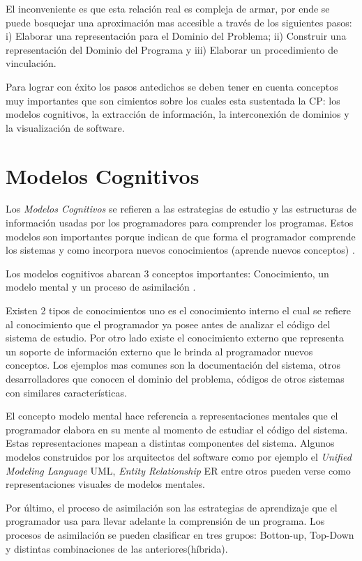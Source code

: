 \documentclass[12pt]{report}
\begin{document}
El inconveniente es que esta relación real es compleja de armar, por ende se puede bosquejar una aproximación mas accesible a través de los siguientes pasos: i) Elaborar una representación para el Dominio del Problema; ii)
Construir una representación del Dominio del Programa y iii) Elaborar un procedimiento de vinculación.
 
Para lograr con éxito los pasos antedichos se deben tener en cuenta conceptos muy importantes que son cimientos sobre los cuales esta sustentada la CP: los modelos cognitivos, la extracción de información, la interconexión de dominios y la visualización de software.

\section{Modelos Cognitivos}

Los \textit{Modelos Cognitivos} se refieren a las estrategias de estudio y las estructuras de información usadas por los programadores para comprender los programas. Estos modelos son importantes porque indican de que forma el programador comprende los sistemas y como incorpora nuevos conocimientos (aprende nuevos conceptos) \cite{MBPHRU10}.

Los modelos cognitivos abarcan 3 conceptos importantes: Conocimiento, un modelo mental y un proceso de asimilación \cite{MAS05}.

Existen 2 tipos de conocimientos uno es el conocimiento interno el cual se refiere al conocimiento que el programador ya posee antes de analizar el código del sistema de estudio. Por otro lado existe el conocimiento externo que representa un soporte de información externo que le brinda al programador nuevos conceptos. Los ejemplos mas comunes son la documentación del sistema, otros desarrolladores que conocen el dominio del problema, códigos de otros sistemas con similares características.

El concepto modelo mental hace referencia a representaciones mentales que el programador elabora en su mente al momento de estudiar el código del sistema. Estas representaciones mapean a distintas componentes del sistema. Algunos modelos construidos por los arquitectos del software como por ejemplo el \textit{Unified Modeling Language} UML, \textit{Entity Relationship} ER entre otros pueden verse como representaciones visuales de modelos mentales. 

Por último, el proceso de asimilación son las estrategias de aprendizaje que el programador usa para llevar adelante la comprensión de un programa. Los procesos de asimilación se pueden clasificar en tres grupos: Botton-up, Top-Down y distintas combinaciones de las anteriores(híbrida)\cite{MPOB03}.
\end{document}
